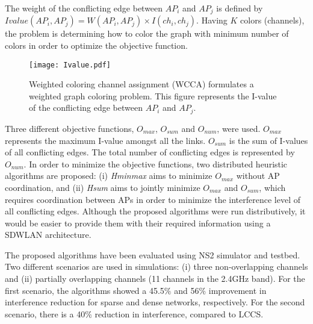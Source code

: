 The weight of the conflicting edge between $AP_{i}$ and $AP_{j}$ is defined by $Ivalue(AP_{i},AP_{j}) = W(AP_{i},AP_{j})\times I(ch_i,ch_j)$.  
Having $K$ colors (channels), the problem is determining how to color the graph with minimum number of colors in order to optimize the objective function. 
%
\begin{figure}[!t]
	\centering
	\texttt{[image: Ivalue.pdf]}
	\caption{Weighted coloring channel assignment (WCCA) \cite{Wcolor-2005} formulates a weighted graph coloring problem. This figure represents the I-value of the conflicting edge between $AP_{i}$ and $AP_{j}$.}
	\label{fig_coloring}
\end{figure}
%
%
Three different objective functions, $O_{max}$, $O_{sum}$ and $O_{num}$, were used. 
$O_{max}$ represents the maximum I-value amongst all the links.
$O_{sum}$ is the sum of I-values of all conflicting edges. 
The total number of conflicting edges is represented by $O_{num}$. 
In order to minimize the objective functions, two distributed heuristic algorithms are proposed: (i) \textit{Hminmax} aims to minimize $O_{max}$ without AP coordination, and (ii) \textit{Hsum} aims to jointly minimize $O_{max}$ and $O_{sum}$, which requires coordination between APs in order to minimize the interference level of all conflicting edges. %
Although the proposed algorithms were run distributively, it would be easier to provide them with their required information using a SDWLAN architecture.

The proposed algorithms have been evaluated using NS2 \cite{NS2} simulator and testbed. %
Two different scenarios are used in simulations: (i) three non-overlapping channels and (ii) partially overlapping channels (11 channels in the 2.4GHz band). 
For the first scenario, the algorithms showed a 45.5$\%$ and 56$\%$ improvement in interference reduction for sparse and dense networks, respectively. 
For the second scenario, there is a 40$\%$ reduction in interference, compared to LCCS. 



